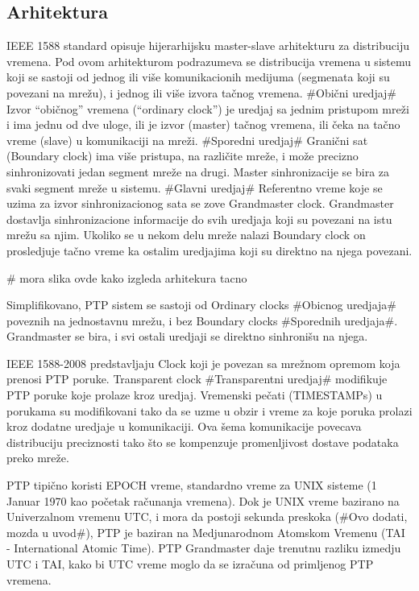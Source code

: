 \documentclass[a4paper,12pt, master]{etf}
\begin{document}
    \subsection{Arhitektura}

	IEEE 1588 standard opisuje hijerarhijsku master-slave arhitekturu za distribuciju vremena.
	Pod	ovom arhitekturom podrazumeva se distribucija vremena u sistemu koji se sastoji od
	jednog ili vi\v{s}e komunikacionih medijuma (segmenata koji su povezani na mre\v{z}u), i jednog
        ili vi\v{s}e izvora ta\v{c}nog vremena. \#Obi\v{c}ni uredjaj\# Izvor ``obi\v{c}nog'' vremena
        (``ordinary clock'') je uredjaj sa jednim pristupom mre\v{z}i i ima jednu od dve uloge, ili je
        izvor (master) ta\v{c}nog vremena, ili \v{c}eka na ta\v{c}no vreme (slave) u komunikaciji na
        mre\v{z}i. \#Sporedni uredjaj\# Grani\v{c}ni sat (Boundary	clock) ima vi\v{s}e pristupa, na
        razli\v{c}ite mre\v{z}e, i mo\v{z}e precizno sinhronizovati jedan segment mre\v{z}e na drugi.
        Master sinhronizacije se bira za svaki segment mre\v{z}e u sistemu. \#Glavni uredjaj\#
        Referentno vreme koje se uzima za izvor sinhronizacionog sata se zove Grandmaster clock.
        Grandmaster dostavlja sinhronizacione informacije do svih uredjaja koji su povezani na istu
        mre\v{z}u sa njim. Ukoliko se u nekom delu mre\v{z}e nalazi Boundary clock on prosledjuje
        ta\v{c}no vreme ka ostalim uredjajima koji su direktno na njega povezani.

	\# mora slika ovde kako izgleda arhitekura tacno

	Simplifikovano, PTP sistem se sastoji od Ordinary clocks \#Obicnog uredjaja\# poveznih na
	jednostavnu mre\v{z}u, i bez Boundary clocks \#Sporednih uredjaja\#. Grandmaster se bira, i svi
	ostali uredjaji se direktno sinhroni\v{s}u na njega.

	IEEE 1588-2008 predstavljaju Clock koji je povezan sa mre\v{z}nom opremom koja prenosi PTP
	poruke.	Transparent clock \#Transparentni uredjaj\# modifikuje PTP poruke koje prolaze
	kroz uredjaj. Vremenski pe\v{c}ati (TIMESTAMPs) u porukama su modifikovani tako da se uzme u
	obzir i vreme za koje poruka prolazi kroz dodatne uredjaje u komunikaciji. Ova \v{s}ema
	komunikacije povecava distribuciju preciznosti tako \v{s}to se kompenzuje promenljivost
	dostave podataka preko mre\v{z}e.

	PTP tipi\v{c}no koristi EPOCH vreme, standardno vreme za UNIX sisteme (1 Januar 1970 kao
    po\v{c}etak	ra\v{c}unanja vremena). Dok je UNIX vreme bazirano na Univerzalnom vremenu UTC,
    i mora da postoji sekunda preskoka (\#Ovo dodati, mozda u uvod\#), PTP je baziran na
	Medjunarodnom Atomskom Vremenu (TAI - International Atomic Time). PTP Grandmaster daje
	trenutnu razliku izmedju UTC i TAI,	kako bi UTC vreme moglo da se izra\v{c}una od primljenog
	PTP vremena.
\end{document}
